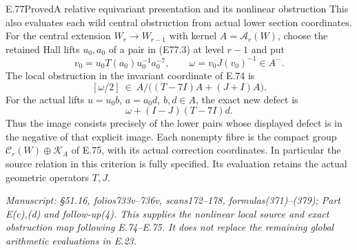 \begin{statement}{E.77}{Proved}{A relative equivariant presentation and its nonlinear obstruction}
This also evaluates each wild central obstruction
from actual lower section coordinates. For the
central extension $W_r\to W_{r-1}$ with kernel
$A=\mathcal A_r(W)$, choose the retained Hall lifts
$u_0,a_0$ of a pair in (E77.3) at level $r-1$ and put
\[
 v_0=u_0T(a_0)u_0^{-1}a_0^{-7},\qquad
 \omega=v_0J(v_0)^{-1}\in A^-.
 \tag{E77.6}
\]
The local obstruction in the invariant coordinate
of E.74 is
\[
 [\omega/2]\ \in\
 A/\bigl((T-7I)A+(J+I)A\bigr).
 \tag{E77.7}
\]
For the actual lifts $u=u_0b$, $a=a_0d$,
$b,d\in A$, the exact new defect is
\[
 \omega+(I-J)(T-7I)d.
 \tag{E77.8}
\]
Thus the image consists precisely of the lower
pairs whose displayed defect is in the negative
of that explicit image. Each nonempty fibre is
the compact group
$\mathcal C_r(W)\oplus\mathcal K_A$ of E.75,
with its actual correction coordinates.
In particular the source relation in this
criterion is fully specified. Its evaluation
retains the actual geometric operators $T,J$.

\emph{Manuscript: \S51.16, folios733v--736v,
scans172--178, formulas(371)--(379); Part E(c),(d)
and follow-up(4). This supplies the nonlinear
local source and exact obstruction map following
E.74--E.75. It does not replace the remaining
global arithmetic evaluations in E.23.}
\end{statement}


